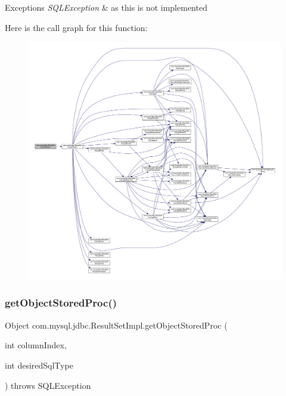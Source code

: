 \begin{DoxyExceptions}{Exceptions}
{\em S\+Q\+L\+Exception} & as this is not implemented \\
\hline
\end{DoxyExceptions}
Here is the call graph for this function\+:
\nopagebreak
\begin{figure}[H]
\begin{center}
\leavevmode
\includegraphics[width=350pt]{classcom_1_1mysql_1_1jdbc_1_1_result_set_impl_a4817a6b6b87b9639afd00209f1c6fac5_cgraph}
\end{center}
\end{figure}
\mbox{\label{classcom_1_1mysql_1_1jdbc_1_1_result_set_impl_a028f86af60dacb114ca80d1cc0637d9b}} 
\subsubsection{\texorpdfstring{get\+Object\+Stored\+Proc()}{getObjectStoredProc()}\hspace{0.1cm}{\footnotesize\ttfamily [1/4]}}
{\footnotesize\ttfamily Object com.\+mysql.\+jdbc.\+Result\+Set\+Impl.\+get\+Object\+Stored\+Proc (\begin{DoxyParamCaption}\item[{int}]{column\+Index,  }\item[{int}]{desired\+Sql\+Type }\end{DoxyParamCaption}) throws S\+Q\+L\+Exception}

